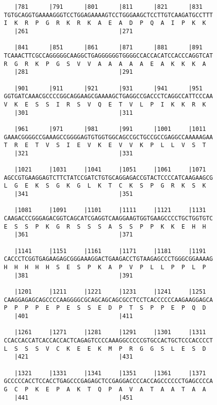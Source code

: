 \documentclass{article}
\begin{document}
\begin{Verbatim}
   |781      |791      |801      |811      |821      |831   
TGTGCAGGTGAAAAGGGTCCTGGAGAAAAGTCCTGGGAAGCTCCTTGTCAAGATGCCTTT
I  K  R  P  G  R  K  R  K  A  E  A  D  P  Q  A  I  P  K  K  
   |261                          |271                       
  
   |841      |851      |861      |871      |881      |891   
TCAAACTTCGCCAGGGGGCAAGGCTGAGGGGGGTGGGGCCACCACATCCACCCAGGTCAT
R  G  R  K  P  G  S  V  V  A  A  A  A  A  E  A  K  K  K  A  
   |281                          |291                       
  
   |901      |911      |921      |931      |941      |951   
GGTGATCAAACGCCCCGGCAGGAAGCGAAAAGCTGAGGCCGACCCTCAGGCCATTCCCAA
V  K  E  S  S  I  R  S  V  Q  E  T  V  L  P  I  K  K  R  K  
   |301                          |311                       
  
   |961      |971      |981      |991      |1001     |1011  
GAAACGGGGCCGAAAGCCGGGGAGTGTGGTGGCAGCCGCTGCCGCCGAGGCCAAAAAGAA
T  R  E  T  V  S  I  E  V  K  E  V  V  K  P  L  L  V  S  T  
   |321                          |331                       
  
   |1021     |1031     |1041     |1051     |1061     |1071  
AGCCGTGAAGGAGTCTTCTATCCGATCTGTGCAGGAGACCGTACTCCCCATCAAGAAGCG
L  G  E  K  S  G  K  G  L  K  T  C  K  S  P  G  R  K  S  K  
   |341                          |351                       
  
   |1081     |1091     |1101     |1111     |1121     |1131  
CAAGACCCGGGAGACGGTCAGCATCGAGGTCAAGGAAGTGGTGAAGCCCCTGCTGGTGTC
E  S  S  P  K  G  R  S  S  S  A  S  S  P  P  K  K  E  H  H  
   |361                          |371                       
  
   |1141     |1151     |1161     |1171     |1181     |1191  
CACCCTCGGTGAGAAGAGCGGGAAAGGACTGAAGACCTGTAAGAGCCCTGGGCGGAAAAG
H  H  H  H  H  S  E  S  P  K  A  P  V  P  L  L  P  P  L  P  
   |381                          |391                       
  
   |1201     |1211     |1221     |1231     |1241     |1251  
CAAGGAGAGCAGCCCCAAGGGGCGCAGCAGCAGCGCCTCCTCACCCCCCAAGAAGGAGCA
P  P  P  P  E  P  E  S  S  E  D  P  T  S  P  P  E  P  Q  D  
   |401                          |411                       
  
   |1261     |1271     |1281     |1291     |1301     |1311  
CCACCACCATCACCACCACTCAGAGTCCCCAAAGGCCCCCGTGCCACTGCTCCCACCCCT
L  S  S  S  V  C  K  E  E  K  M  P  R  G  G  S  L  E  S  D  
   |421                          |431                       
  
   |1321     |1331     |1341     |1351     |1361     |1371  
GCCCCCACCTCCACCTGAGCCCGAGAGCTCCGAGGACCCCACCAGCCCCCCTGAGCCCCA
G  C  P  K  E  P  A  K  T  Q  P  A  V  A  T  A  A  T  A  A  
   |441                          |451                       
  

\end{Verbatim}
\end{document}
